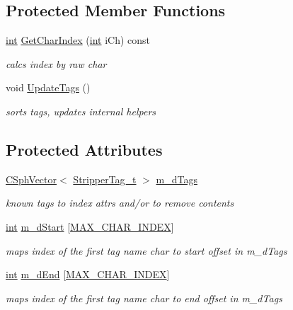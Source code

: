 \subsection*{Protected Member Functions}
\begin{DoxyCompactItemize}
\item 
\hyperlink{sphinxexpr_8cpp_a4a26e8f9cb8b736e0c4cbf4d16de985e}{int} \hyperlink{classCSphHTMLStripper_a2f92681fa28b7f76095b1b98192fb1bc}{Get\-Char\-Index} (\hyperlink{sphinxexpr_8cpp_a4a26e8f9cb8b736e0c4cbf4d16de985e}{int} i\-Ch) const 
\begin{DoxyCompactList}\small\item\em calcs index by raw char \end{DoxyCompactList}\item 
void \hyperlink{classCSphHTMLStripper_a66f37d6ef201ef02f509df01e9806c28}{Update\-Tags} ()
\begin{DoxyCompactList}\small\item\em sorts tags, updates internal helpers \end{DoxyCompactList}\end{DoxyCompactItemize}
\subsection*{Protected Attributes}
\begin{DoxyCompactItemize}
\item 
\hyperlink{classCSphVector}{C\-Sph\-Vector}$<$ \hyperlink{structCSphHTMLStripper_1_1StripperTag__t}{Stripper\-Tag\-\_\-t} $>$ \hyperlink{classCSphHTMLStripper_a49a2ccd3e42cbc5799cb3026448813ab}{m\-\_\-d\-Tags}
\begin{DoxyCompactList}\small\item\em known tags to index attrs and/or to remove contents \end{DoxyCompactList}\item 
\hyperlink{sphinxexpr_8cpp_a4a26e8f9cb8b736e0c4cbf4d16de985e}{int} \hyperlink{classCSphHTMLStripper_a2022427fa6d9f73889a1444f59da8428}{m\-\_\-d\-Start} \mbox{[}\hyperlink{classCSphHTMLStripper_acb1842ca8b483ff8df6ea3648fbca5ff}{M\-A\-X\-\_\-\-C\-H\-A\-R\-\_\-\-I\-N\-D\-E\-X}\mbox{]}
\begin{DoxyCompactList}\small\item\em maps index of the first tag name char to start offset in m\-\_\-d\-Tags \end{DoxyCompactList}\item 
\hyperlink{sphinxexpr_8cpp_a4a26e8f9cb8b736e0c4cbf4d16de985e}{int} \hyperlink{classCSphHTMLStripper_af3293a9a7026540726a7ef9cce2a3c15}{m\-\_\-d\-End} \mbox{[}\hyperlink{classCSphHTMLStripper_acb1842ca8b483ff8df6ea3648fbca5ff}{M\-A\-X\-\_\-\-C\-H\-A\-R\-\_\-\-I\-N\-D\-E\-X}\mbox{]}
\begin{DoxyCompactList}\small\item\em maps index of the first tag name char to end offset in m\-\_\-d\-Tags \end{DoxyCompactList}\end{DoxyCompactItemize}

